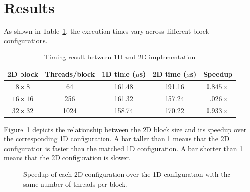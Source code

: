 \documentclass{report}
\begin{document}
\section{Results}
As shown in Table~\ref{tab:results}, the execution times vary across different block configurations. 

\begin{table}[ht]
  \centering
  \caption{Timing result between 1D and 2D implementation}
  \label{tab:results}
  \begin{tabular}{ccccc}
    \toprule
    2D block & Threads/block & 1D time ($\mu$s) & 2D time ($\mu$s) & Speedup \\
    \midrule
    $8\times8$   & 64   & 161.48 & 191.16 & $0.845\times$ \\
    $16\times16$ & 256  & 161.32 & 157.24 & $1.026\times$ \\
    $32\times32$ & 1024 & 158.74 & 170.22 & $0.933\times$ \\
    \bottomrule
  \end{tabular}
\end{table}

Figure~\ref{fig:speedup} depicts the relationship between the 2D block size and its speedup over the corresponding 1D configuration. A bar taller than 1 means that the 2D configuration is faster than the matched 1D configuration. A bar shorter than 1 means that the 2D configuration is slower.

\begin{figure}[ht]
  \centering
  \caption{Speedup of each 2D configuration over the 1D configuration with the same number of threads per block.}
  \label{fig:speedup}
\end{figure}
\end{document}

